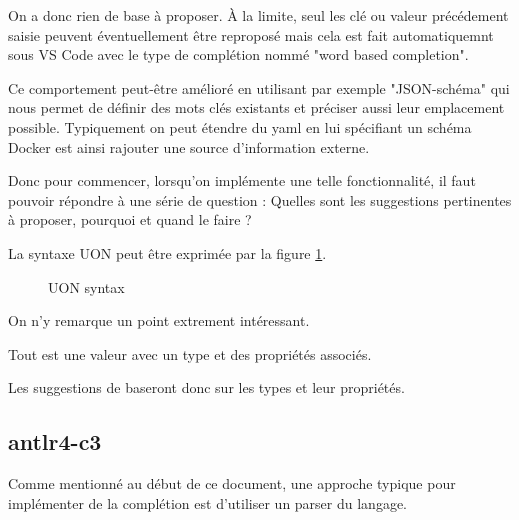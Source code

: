 \documentclass[
    iict, %
    il, %
]{heig-tb}
\begin{document}

On a donc rien de base à proposer. À la limite, seul les clé ou valeur précédement saisie peuvent éventuellement être reproposé mais cela est fait automatiquemnt sous VS Code
avec le type de complétion nommé "word based completion".

Ce comportement peut-être amélioré en utilisant par exemple "JSON-schéma" qui nous permet de définir des mots clés existants et préciser aussi leur emplacement possible.
Typiquement on peut étendre du yaml en lui spécifiant un schéma Docker est ainsi rajouter une source d'information externe.

Donc pour commencer, lorsqu'on implémente une telle fonctionnalité, il faut pouvoir répondre à une série de question :
Quelles sont les suggestions pertinentes à proposer, pourquoi et quand le faire ?

La syntaxe UON peut être exprimée par la figure \ref{syntax}.

\begin{figure}[!ht]
    \begin{center}
    \end{center}
    \caption[syntax]{\label{syntax} UON syntax}
\end{figure}

On n'y remarque un point extrement intéressant.

Tout est une valeur avec un type et des propriétés associés.

Les suggestions de baseront donc sur les types et leur propriétés.


\subsection{antlr4-c3}

Comme mentionné au début de ce document, une approche typique pour implémenter de la complétion est d'utiliser un parser du langage.
\end{document}
